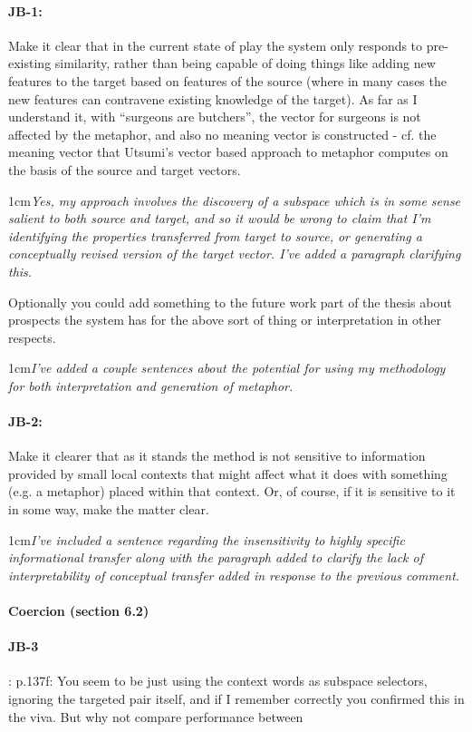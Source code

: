 \documentclass[11pt,a4paper]{article}
\newcommand{\res}[1]{\vspace{0.25cm} \begin{adjustwidth}{1cm}{}\emph{#1}\end{adjustwidth}}
\begin{document}
\paragraph{JB-1:} Make it clear that in the current state of play the system only responds to pre-existing similarity, rather than being capable of doing things like adding new features to the target based on features of the source (where in many cases the new features can contravene existing knowledge of the target).  As far as I understand it, with ``surgeons are butchers'', the vector for surgeons is not affected by the metaphor, and also no meaning vector is constructed - cf. the meaning vector that Utsumi's vector based approach to metaphor computes on the basis of the source and target vectors.

\res{Yes, my approach involves the discovery of a subspace which is in some sense salient to both source and target, and so it would be wrong to claim that I'm identifying the properties transferred from target to source, or generating a conceptually revised version of the target vector.  I've added a paragraph clarifying this.}

Optionally you could add something to the future work part of the thesis about prospects the system has for the above sort of thing or interpretation in other respects.

\res{I've added a couple sentences about the potential for using my methodology for both interpretation and generation of metaphor.}

\paragraph{JB-2:} Make it clearer that as it stands the method is not sensitive to information provided by small local contexts that might affect what it does with something (e.g. a metaphor) placed within that context. Or, of course, if it is sensitive to it in some way, make the matter clear.

\res{I've included a sentence regarding the insensitivity to highly specific informational transfer along with the paragraph added to clarify the lack of interpretability of conceptual transfer added in response to the previous comment.}


\paragraph{Coercion (section 6.2)}

\paragraph{JB-3}: p.137f: You seem to be just using the context words as subspace selectors, ignoring the targeted pair itself, and if I remember correctly you confirmed this in the viva. But why not compare performance between
\end{document}
